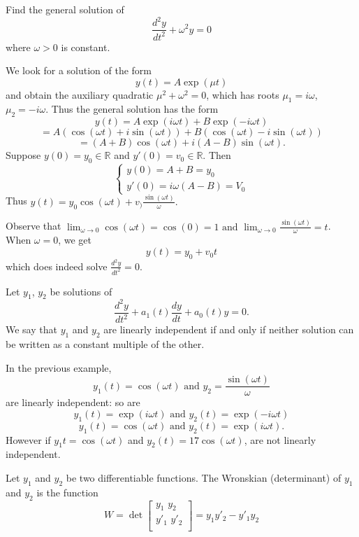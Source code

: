 \begin{example}
Find the general solution of $$\frac{d^2y}{dt^2} + \omega^2y = 0$$ where $\omega>0$ is constant.
\begin{solution}
We look for a solution of the form $$y(t) = A\exp(\mu t)$$ and obtain the auxiliary quadratic $\mu^2 + \omega^2 = 0$, which has roots $\mu_1 = i\omega$, $\mu_2 = -i\omega$. Thus the general solution has the form $$y(t) = A\exp(i\omega t) + B\exp(-i\omega t)$$
$$ = A(\cos(\omega t ) +i\sin(\omega t)) + B(\cos(\omega t) - i\sin(\omega t))$$ $$= (A+B)\cos(\omega t) +i(A-B)\sin(\omega t).$$
Suppose $y(0) = y_0 \in \mathbb{R}$ and $y'(0) = v_0 \in \mathbb{R}.$ Then 
$$ 
\begin{cases}
y(0) = A+B = y_0 \\
y'(0) = i\omega(A-B) = V_0
\end{cases} $$
Thus $y(t) = y_0\cos(\omega t) + v_)\frac{\sin(\omega t)}{\omega}.$
\end{solution}
\end{example}
\begin{remark}
Observe that $\lim_{\omega \to 0}\cos(\omega t) = \cos(0) = 1 \mbox{ and } \lim_{\omega \to 0}\frac{\sin(\omega t)}{\omega} = t$. When $\omega = 0$, we get $$y(t) = y_0 + v_0t$$ which does indeed solve $\frac{d^2y}{dt^2} = 0$.
\end{remark}
\begin{definition}
Let $y_1$, $y_2$ be solutions of $$\frac{d^2y}{dt^2} + a_1(t)\frac{dy}{dt} +a_0(t)y=0.$$ We say that $y_1$ and $y_2$ are linearly independent if and only if neither solution can be written as a constant multiple of the other.
\end{definition}
\begin{example}
In the previous example, $$y_1(t) = \cos(\omega t) \mbox{ and }  y_2 = \frac{\sin(\omega t)}{\omega}$$ are linearly independent: so are $$y_1(t) = \exp(i \omega t) \mbox{ and } y_2(t) = \exp(-i \omega t)$$  $$y_1(t) = \cos(\omega t) \mbox{ and } y_2(t) = \exp(i\omega t).$$ However if $y_1t = \cos(\omega t)$ and $y_2(t) = 17 \cos(\omega t)$, are not linearly independent.
\end{example}
\begin{definition}
Let $y_1$ and $y_2$ be two differentiable functions. The Wronskian (determinant) of $y_1$ and $y_2$ is the function $$W = \det \begin{bmatrix}
y_1 \hspace{4pt} y_2 \\
y'_1 \hspace{4pt} y'_2 \\
\end{bmatrix}
= y_1y'_2 - y'_1y_2$$
\end{definition}
